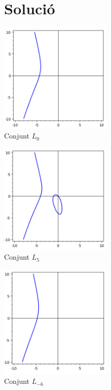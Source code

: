 \documentclass[12pt]{report}
\begin{document}
\section{Solució}


\begin{center}
    \includegraphics[width=0.4\textwidth]{conjuntzero.PNG}\\
    Conjunt \textit{$L_0$}
\end{center}

\begin{center}
    \includegraphics[width=0.4\textwidth]{conjuntcinc.PNG}\\
     Conjunt \textit{$L_5$}
\end{center}

\begin{center}
    \includegraphics[width=0.4\textwidth]{conjuntsis.PNG}\\
     Conjunt \textit{$L_{-6}$}
\end{center}
\end{document}
